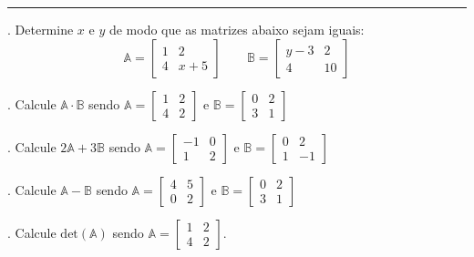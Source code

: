 \documentclass{article}
\newcommand{\resposta}{\hfill\makebox[0pt][r]{\scriptsize\textit{Resposta:\rule{5cm}{.1pt}}}\\ \vspace{.1cm}}
\begin{document}
\par\noindent\rule{\textwidth}{1pt}

\vspace{0.25 cm}

. Determine $x$ e $y$ de modo que as matrizes abaixo sejam iguais:
\begin{equation*}\label{key}
\mathbb{A} = \left[ \begin{matrix} 1&2 \\ 4&x+5 \end{matrix} \right] \qquad \mathbb{B} = \left[ \begin{matrix} y-3&2 \\ 4&10 \end{matrix} \right]
\end{equation*}

. Calcule $\mathbb{A} \cdot \mathbb{B}$ sendo $\mathbb{A} = \left[ \begin{matrix} 1&2 \\ 4&2 \end{matrix} \right]$ e $\mathbb{B} = \left[ \begin{matrix} 0&2 \\ 3&1 \end{matrix} \right]$

. Calcule $2 \mathbb{A} +3 \mathbb{B}$ sendo $\mathbb{A} = \left[ \begin{matrix} -1&0 \\ 1&2 \end{matrix} \right]$ e $\mathbb{B} = \left[ \begin{matrix} 0&2 \\ 1&-1 \end{matrix} \right]$

. Calcule $\mathbb{A} - \mathbb{B}$ sendo $\mathbb{A} = \left[ \begin{matrix} 4&5 \\ 0&2 \end{matrix} \right]$ e $\mathbb{B} = \left[ \begin{matrix} 0&2 \\ 3&1 \end{matrix} \right]$

. Calcule $\mathrm{det}(\mathbb{A})$ sendo $\mathbb{A} = \left[ \begin{matrix} 1&2 \\ 4&2 \end{matrix} \right]$.
\end{document}
